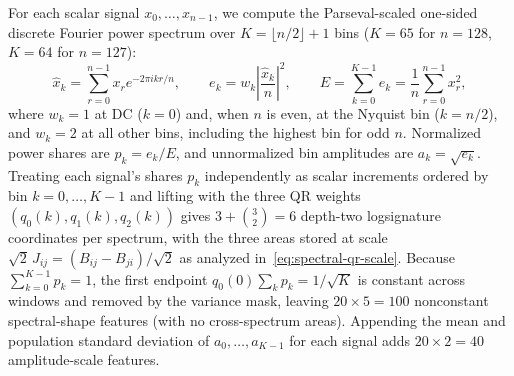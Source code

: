 For each scalar signal \(x_0, \ldots, x_{n-1}\), we compute the Parseval-scaled
one-sided discrete Fourier power spectrum over \(K = \lfloor n/2 \rfloor + 1\)
bins (\(K = 65\) for \(n = 128\), \(K = 64\) for \(n = 127\)):
\[
 \widehat x_k = \sum_{r=0}^{n-1} x_r e^{-2\pi i k r / n}, \qquad
 e_k = w_k \left|\frac{\widehat x_k}{n}\right|^2, \qquad
 E = \sum_{k=0}^{K-1} e_k = \frac{1}{n}\sum_{r=0}^{n-1} x_r^2,
\]
where \(w_k = 1\) at DC (\(k = 0\)) and, when \(n\) is even, at the Nyquist bin
(\(k = n/2\)), and \(w_k = 2\) at all other bins, including the highest bin for
odd \(n\). Normalized power shares are \(p_k = e_k / E\), and unnormalized bin
amplitudes are
\(a_k = \sqrt{e_k}\). Treating each signal's shares \(p_k\) independently as
scalar increments ordered by bin \(k = 0, \ldots, K-1\) and lifting with the
three QR weights \((q_0(k), q_1(k), q_2(k))\) gives \(3 + \binom{3}{2} = 6\)
depth-two logsignature coordinates per spectrum, with the three areas stored at
scale \(\sqrt 2\,J_{ij} = (B_{ij} - B_{ji})/\sqrt 2\) as analyzed
in~\eqref{eq:spectral-qr-scale}. Because \(\sum_{k=0}^{K-1} p_k = 1\), the first
endpoint \(q_0(0)\sum_k p_k = 1/\sqrt K\) is constant across windows and removed
by the variance mask, leaving \(20 \times 5 = 100\) nonconstant spectral-shape
features (with no cross-spectrum areas). Appending the mean and population
standard deviation of \(a_0, \ldots, a_{K-1}\) for each signal adds
\(20 \times 2 = 40\) amplitude-scale features.

